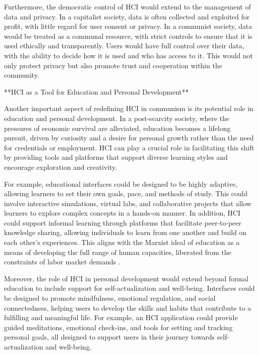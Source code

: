 Furthermore, the democratic control of HCI would extend to the management of data and privacy. In a capitalist society, data is often collected and exploited for profit, with little regard for user consent or privacy. In a communist society, data would be treated as a communal resource, with strict controls to ensure that it is used ethically and transparently. Users would have full control over their data, with the ability to decide how it is used and who has access to it. This would not only protect privacy but also promote trust and cooperation within the community.

**HCI as a Tool for Education and Personal Development**

Another important aspect of redefining HCI in communism is its potential role in education and personal development. In a post-scarcity society, where the pressures of economic survival are alleviated, education becomes a lifelong pursuit, driven by curiosity and a desire for personal growth rather than the need for credentials or employment. HCI can play a crucial role in facilitating this shift by providing tools and platforms that support diverse learning styles and encourage exploration and creativity.

For example, educational interfaces could be designed to be highly adaptive, allowing learners to set their own goals, pace, and methods of study. This could involve interactive simulations, virtual labs, and collaborative projects that allow learners to explore complex concepts in a hands-on manner. In addition, HCI could support informal learning through platforms that facilitate peer-to-peer knowledge sharing, allowing individuals to learn from one another and build on each other's experiences. This aligns with the Marxist ideal of education as a means of developing the full range of human capacities, liberated from the constraints of labor market demands \cite[pp.~98-101]{marx1867}.

Moreover, the role of HCI in personal development would extend beyond formal education to include support for self-actualization and well-being. Interfaces could be designed to promote mindfulness, emotional regulation, and social connectedness, helping users to develop the skills and habits that contribute to a fulfilling and meaningful life. For example, an HCI application could provide guided meditations, emotional check-ins, and tools for setting and tracking personal goals, all designed to support users in their journey towards self-actualization and well-being.

